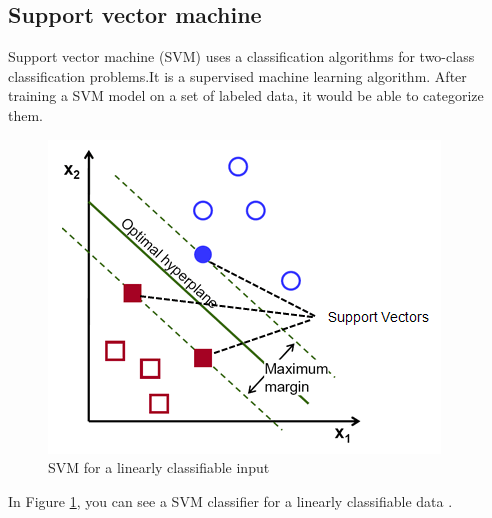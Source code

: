 \subsection{Support vector machine}
Support vector machine (SVM)  uses a classification algorithms for two-class classification problems.It is a supervised machine learning algorithm. After training a SVM model on a set of labeled data, it would be able to categorize them.

\begin{figure}[ht]
    \centering
    \includegraphics{Pictures/SVM_margin.png}
    \caption{SVM for a linearly classifiable input}
    \label{fig:svm}
\end{figure}
In Figure \ref{fig:svm}, you can see a SVM classifier for a linearly classifiable data \cite{svm}.

